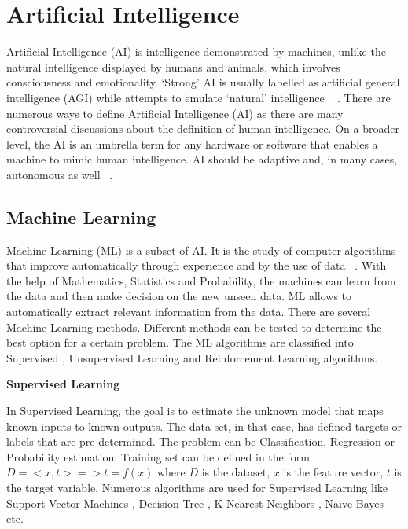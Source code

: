 \section{Artificial Intelligence}
Artificial Intelligence (AI) is intelligence demonstrated by machines, unlike the natural intelligence displayed by humans and animals, which involves consciousness and emotionality. `Strong' AI is usually labelled as artificial general intelligence (AGI) while attempts to emulate `natural' intelligence ~\cite{poole1998computational} .
There are numerous ways to define Artificial Intelligence (AI) as there are many controversial discussions about the definition of human intelligence. On a broader level, the AI is an umbrella term for any hardware or software that enables a machine to mimic human intelligence. AI should be adaptive and, in many cases, autonomous as well ~\cite{touger2020}.
\subsection{Machine Learning}

Machine Learning (ML) is a subset of AI. It is the study of computer algorithms that improve automatically through experience and by the use of data ~\cite{mitchell1997machine}. With the help of Mathematics, Statistics and Probability, the machines can learn from the data and then make decision on the new unseen data. ML allows to automatically extract relevant information from the data.
There are several Machine Learning methods. Different methods can be tested to determine the best option for a certain problem. The ML algorithms are classified into Supervised , Unsupervised Learning and Reinforcement Learning algorithms.
\newline

\noindent \textbf{Supervised Learning}
\newline

\noindent In Supervised Learning, the goal is to estimate the unknown model that maps known inputs to known outputs. The data-set, in that case, has defined targets or labels that are pre-determined. The problem can be Classification, Regression or Probability estimation. Training set can be defined in the form \( D = {<x,t>} => t = f(x)  \) where \(D\) is the dataset, \(x\) is the feature vector, \(t\) is the target variable. Numerous algorithms are used for Supervised Learning like Support Vector Machines \cite{noble2006support}, Decision Tree \cite{myles2004introduction}, K-Nearest Neighbors \cite{dudani1976distance}, Naive Bayes \cite{murphy2006naive} etc. 
\newline

